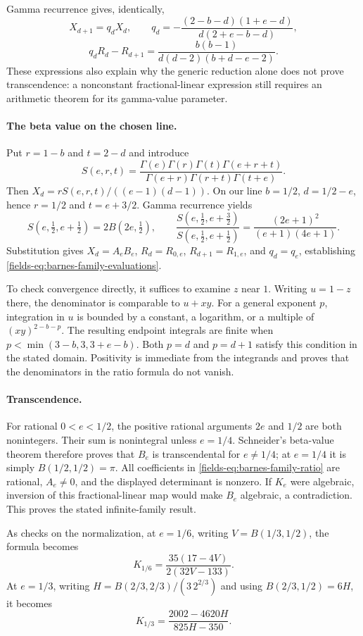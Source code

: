 \documentclass[11pt,a4paper]{article}
\theoremstyle{definition}
\theoremstyle{remark}
\numberwithin{equation}{section}
\begin{document}
Gamma recurrence gives, identically,
\[
 X_{d+1}=q_dX_d,\qquad
 q_d=-\frac{(2-b-d)(1+e-d)}{d(2+e-b-d)},
\]
\[
 q_dR_d-R_{d+1}
 =\frac{b(b-1)}{d(d-2)(b+d-e-2)}.
\]
These expressions also explain why the generic reduction alone does
not prove transcendence: a nonconstant fractional-linear expression
still requires an arithmetic theorem for its gamma-value parameter.

\paragraph{The beta value on the chosen line.}
Put $r=1-b$ and $t=2-d$ and introduce
\[
 S(e,r,t)=\frac{\Gamma(e)\Gamma(r)\Gamma(t)\Gamma(e+r+t)}
 {\Gamma(e+r)\Gamma(r+t)\Gamma(t+e)}.
\]
Then $X_d=rS(e,r,t)/((e-1)(d-1))$.
On our line $b=1/2$, $d=1/2-e$, hence $r=1/2$ and $t=e+3/2$.
Gamma recurrence yields
\[
 S(e,\tfrac12,e+\tfrac12)=2B(2e,\tfrac12),
\qquad
 \frac{S(e,\tfrac12,e+\tfrac32)}{S(e,\tfrac12,e+\tfrac12)}
 =\frac{(2e+1)^2}{(e+1)(4e+1)}.
\]
Substitution gives $X_d=A_eB_e$, $R_d=R_{0,e}$,
$R_{d+1}=R_{1,e}$, and $q_d=q_e$, establishing
\eqref{fields-eq:barnes-family-evaluations}.

To check convergence directly, it suffices to examine $z$ near $1$.
Writing $u=1-z$ there, the denominator is comparable to $u+xy$.
For a general exponent $p$, integration in $u$ is bounded by a
constant, a logarithm, or a multiple of $(xy)^{2-b-p}$.
The resulting endpoint integrals are finite when
$p<\min(3-b,3,3+e-b)$.  Both $p=d$ and $p=d+1$ satisfy this
condition in the stated domain.  Positivity is immediate from the
integrands and proves that the denominators in the ratio formula
do not vanish.

\paragraph{Transcendence.}
For rational $0<e<1/2$, the positive rational arguments $2e$ and
$1/2$ are both nonintegers.  Their sum is nonintegral unless
$e=1/4$.  Schneider's beta-value theorem therefore proves that
$B_e$ is transcendental for $e\ne1/4$; at $e=1/4$ it is simply
$B(1/2,1/2)=\pi$.  All coefficients in
\eqref{fields-eq:barnes-family-ratio} are rational, $A_e\ne0$, and the
displayed determinant is nonzero.  If $K_e$ were algebraic, inversion
of this fractional-linear map would make $B_e$ algebraic, a
contradiction.  This proves the stated infinite-family result.

As checks on the normalization, at $e=1/6$, writing
$V=B(1/3,1/2)$, the formula becomes
\[
 K_{1/6}=\frac{35(17-4V)}{2(32V-133)}.
\]
At $e=1/3$, writing $H=B(2/3,2/3)/(3\,2^{2/3})$ and using
$B(2/3,1/2)=6H$, it becomes
\[
 K_{1/3}=\frac{2002-4620H}{825H-350}.
\]
\end{document}

